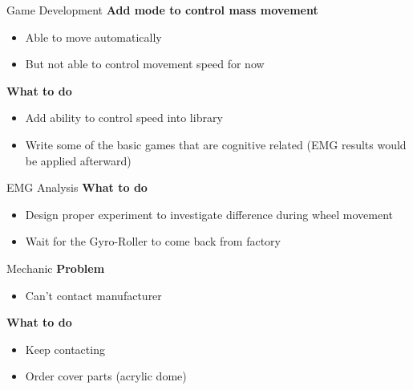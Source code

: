 \documentclass[10pt]{beamer}
\begin{document}
	\begin{frame}{Game Development}
		\large \textbf{Add mode to control mass movement}
		\normalsize
		\begin{itemize}
			\item Able to move automatically
			\item But not able to control movement speed for now
		\end{itemize}
		\large \textbf{What to do}
		\normalsize
		\begin{itemize}
			\item Add ability to control speed into library
			\item Write some of the basic games that are cognitive related (EMG results would be applied afterward)
		\end{itemize}
	\end{frame}
	
	\begin{frame}{EMG Analysis}
		\large \textbf{What to do}
		\normalsize
		\begin{itemize}
			\item Design proper experiment to investigate difference during wheel movement
			\item Wait for the Gyro-Roller to come back from factory
		\end{itemize}
	\end{frame}
	
	\begin{frame}{Mechanic}
		\large \textbf{Problem}
		\normalsize
		\begin{itemize}
			\item Can't contact manufacturer
		\end{itemize}
		\large \textbf{What to do}
		\normalsize
		\begin{itemize}
			\item Keep contacting
			\item Order cover parts (acrylic dome)
		\end{itemize}
	\end{frame}
	
	
	
	
\end{document}
